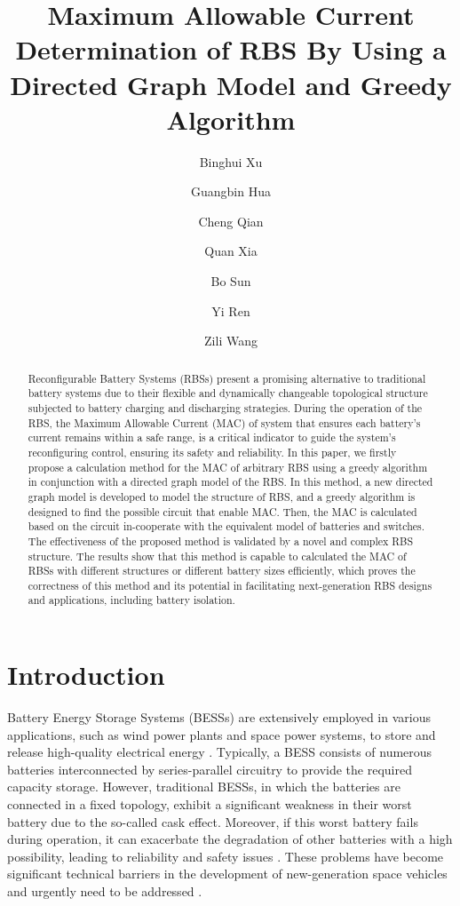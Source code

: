 \documentclass{article}
\title{Maximum Allowable Current Determination of RBS By Using a Directed Graph Model and Greedy Algorithm}
\author[1$\dag$]{Binghui Xu}
\author[1$\dag$]{Guangbin Hua}
\author[1*]{Cheng Qian}
\author[1,2]{Quan Xia}
\author[1]{Bo Sun}
\author[1]{Yi Ren}
\author[1]{Zili Wang}
\affil[1]{School of Reliability and Systems Engineering, Beihang University, Beijing, 100191, China}
\affil[2]{School of Aeronautic Science and Engineering at Beihang University, Beijing, China}
\affil[*]{Address correspondence to: cqian@buaa.edu.cn}
\affil[$\dag$]{These authors contributed equally to this work.}
\date{}
\begin{document}
\maketitle

\begin{abstract}
Reconfigurable Battery Systems (RBSs) present a promising alternative to traditional battery systems due to their flexible and dynamically changeable topological structure subjected to battery charging and discharging strategies. During the operation of the RBS, the Maximum Allowable Current (MAC) of system that ensures each battery’s current remains within a safe range, is a critical indicator to guide the system’s reconfiguring control, ensuring its safety and reliability. In this paper, we firstly propose a calculation method for the MAC of arbitrary RBS using a greedy algorithm in conjunction with a directed graph model of the RBS.  In this method, a new directed graph model is developed to model the structure of RBS, and a greedy algorithm is designed to find the possible circuit that enable MAC. Then, the MAC is calculated based on the circuit in-cooperate with the equivalent model of batteries and switches. The effectiveness of the proposed method is validated by a novel and complex RBS structure. The results show that this method is capable to calculated the MAC of RBSs with different structures or different battery sizes efficiently, which proves the correctness of this method and its potential in facilitating next-generation RBS designs and applications, including battery isolation.
\end{abstract}


\section{Introduction}

Battery Energy Storage Systems (BESSs) are extensively employed in various applications, such as wind power plants and space power systems, to store and release high-quality electrical energy \cite{desiqueiraControlStrategySmooth2021,yangBatteryEnergyStorage2018,choCommercialResearchBattery2015,zhangDevelopmentProspectChinese2021,schwanbeckInternationalSpaceStation2019}.
Typically, a BESS consists of numerous batteries interconnected by series-parallel circuitry to provide the required capacity storage.
However, traditional BESSs, in which the batteries are connected in a fixed topology, exhibit a significant weakness in their worst battery due to the so-called cask effect.
Moreover, if this worst battery fails during operation, it can exacerbate the degradation of other batteries with a high possibility, leading to reliability and safety issues \cite{yangUnbalancedDischargingAging2016,fengPropagationMechanismsDiagnosis2019,jeevarajanBatterySafetyQualifications2012}.
These problems have become significant technical barriers in the development of new-generation space vehicles and urgently need to be addressed \cite{pomboHybridPowerSystem2021}.
\end{document}
